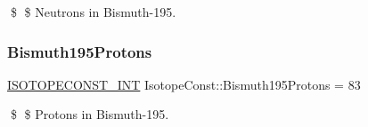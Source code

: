 \$ \$ Neutrons in Bismuth-\/195. \mbox{\label{group___isotope_const-_bismuth-_bi195_gabd84e970f4138a3f095b40b9eefd7bdb}} 
\subsubsection{\texorpdfstring{Bismuth195\+Protons}{Bismuth195Protons}}
{\footnotesize\ttfamily \mbox{\hyperlink{group___isotope_const-_macros_ga5f18360b3e99483a35c32d789e62621c}{I\+S\+O\+T\+O\+P\+E\+C\+O\+N\+S\+T\+\_\+\+I\+NT}} Isotope\+Const\+::\+Bismuth195\+Protons = 83}

\$ \$ Protons in Bismuth-\/195. 